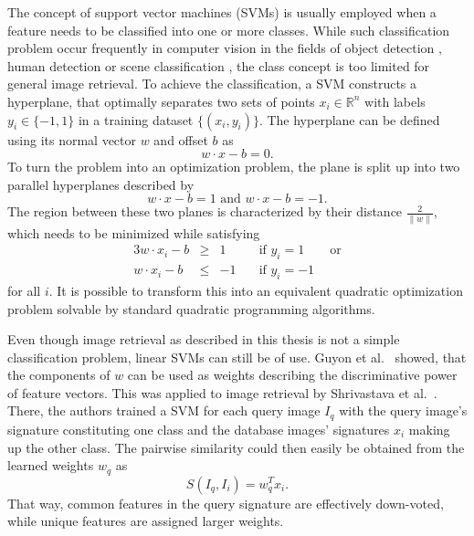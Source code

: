 The concept of support vector machines (SVMs) is usually employed when a
feature needs to be classified into one or more classes. While such
classification problem occur frequently in computer vision in the fields of
object detection \autocite{pontil_support_1998} \autocite{csurka_visual_2004},
human detection \autocite{dalal_histograms_2005} or scene classification
\autocite{yang_evaluating_2007}, the class concept is too limited for general
image retrieval. To achieve the classification, a SVM constructs a hyperplane,
that optimally separates two sets of points $x_i \in \mathbb{R}^n$ with labels
$y_i \in \{-1, 1 \}$ in a training dataset $\{ (x_i, y_i) \}$. The hyperplane
can be defined using its normal vector $w$ and offset $b$ as
\begin{equation*}
    w \cdot x - b = 0.
\end{equation*}
To turn the problem into an optimization problem, the plane is split up into
two parallel hyperplanes described by
\begin{equation*}
    w \cdot x - b = 1 \text{ and } w \cdot x - b = -1.
\end{equation*}
The region between these two planes is characterized by their distance
$\frac{2}{\| w \|}$, which needs to be minimized while satisfying
\begin{alignat*}{3}
    w \cdot x_i - b & \geq & 1 & \quad \text{if } y_i = 1 \qquad \text{or} \\
    w \cdot x_i - b & \leq & -1 & \quad \text{if } y_i = -1
\end{alignat*}
for all $i$. It is possible to transform this into an equivalent quadratic
optimization problem solvable by standard quadratic programming algorithms.

Even though image retrieval as described in this thesis is not a simple
classification problem, linear SVMs can still be of use. Guyon et al.\
\autocite{guyon_gene_2002} showed, that the components of $w$ can be used as
weights describing the discriminative power of feature vectors. This was
applied to image retrieval by Shrivastava et al.\ 
\autocite{shrivastava_data-driven_2011}. There, the authors trained a SVM for
each query image $I_q$ with the query image's signature constituting one class
and the database images' signatures $x_i$ making up the other class. The
pairwise similarity could then easily be obtained from the learned weights
$w_q$ as
\begin{equation*}
    S(I_q, I_i) = w_q^T x_i.
\end{equation*}
That way, common features in the query signature are effectively down-voted,
while unique features are assigned larger weights.

